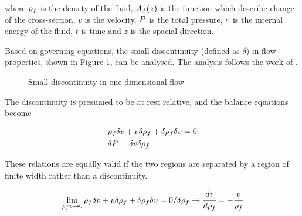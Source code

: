 \documentclass[a4paper,fleqn]{cas-dc}
\begin{document}
where ${\color{black}\rho_f}$ is the density of the fluid, ${\color{black}A_f}(z)$ is the function which describe change of the cross-section, $v$ is the velocity, ${\color{black}P}$ is the total pressure, ${\color{black}e}$ is the internal energy of the fluid, $t$ is time and $z$ is the spacial direction.

Based on governing equations, the small discontinuity (defined as $\delta$) in flow properties, shown in Figure \ref{fig: Discontinuity_slow_flow}, can be analysed. The analysis follows the work of \citet{Schreier1982}.

\begin{figure}[!h]
	\centering
	\caption{Small discontinuity in one-dimensional flow}
	\label{fig: Discontinuity_slow_flow}
\end{figure} 

The discontinuity is presumed to be at rest relative, and the balance equations become		

{\footnotesize
	\begin{align*}
		&{\color{black}\rho_f} \delta v + v \delta {\color{black}\rho_f} + \delta {\color{black}\rho_f} \delta v = 0 \\
		&\delta {\color{black}P} = \delta v \delta {\color{black}\rho_f}
	\end{align*}
}

These relations are equally valid if the two regions are separated by a region of finite width rather than a discontinuity. 

{\footnotesize
	\begin{equation*}
		\lim_{{\color{black}\rho_f} v \rightarrow 0} {\color{black}\rho_f} \delta v + v \delta {\color{black}\rho_f} + \delta {\color{black}\rho_f} \delta v = 0 / \delta {\color{black}\rho_f} \rightarrow \cfrac{d v}{d {\color{black}\rho_f}} = - \cfrac{v}{{\color{black}\rho_f}}
	\end{equation*}
}
\end{document}
